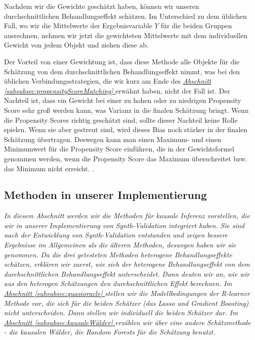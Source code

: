 \documentclass[12pt,a4paper,twoside]{scrartcl}
\numberwithin{equation}{section}
\newcommand{\refsec}[1]{\emph{\hyperref[#1]{Abschnitt \ref*{#1} }}}
\begin{document}
\noindent
Nachdem wir die Gewichte geschätzt haben, können wir unseren durchschnittlichen Behandlungseffekt schätzen. Im Unterschied zu dem üblichen Fall, wo wir die Mittelwerte der Ergebnisvariable $Y$ für die beiden Gruppen ausrechnen, nehmen wir jetzt die gewichteten Mittelwerte mit dem individuellen Gewicht von jedem Objekt und ziehen diese ab.\par

\noindent
Der Vorteil von einer Gewichtung ist, dass diese Methode alle Objekte für die Schätzung von dem durchschnittlichen Behandlungseffekt nimmt, was bei den üblichen Verbindungsstrategien, die wir kurz am Ende des \refsec{subsubsec:propensityScoreMatching} erwähnt haben, nicht der Fall ist. Der Nachteil ist, dass ein Gewicht bei einer zu hohen oder zu niedrigen Propensity Score sehr groß werden kann, was Varianz in die finalen Schätzung bringt. Wenn die Propensity Scores richtig geschätzt sind, sollte dieser Nachteil keine Rolle spielen. Wenn sie aber gestreut sind, wird dieses Bias noch stärker in der finalen Schätzung übertragen. Deswegen kann man einen Maximum- und einen Minimumwert für die Propensity Score einführen, die in der Gewichtsformel genommen werden, wenn die Propensity Score das Maximum überschreitet bzw. das Minimum nicht erreicht. \cite{stuart2010matching}.  
\par

\subsection{Methoden in unserer Implementierung}\label{subsec:methodenInImplementierung}
\noindent
\emph{In diesem Abschnitt werden wir die Methoden für kausale Inferenz vorstellen, die wir in unserer Implementierung von Synth-Validation integriert haben. Sie sind nach der Entwicklung von Synth-Validation entstanden und zeigen bessere Ergebnisse im Allgemeinen als die älteren Methoden, deswegen haben wir sie genommen. Da die drei getesteten Methoden heterogene Behandlungseffekte schätzen, erklären wir zuerst, wie sich der heterogene Behandlungseffekt von dem durchschnittlichen Behandlungseffekt unterscheidet. Dann deuten wir an, wie wir aus den heterogen Schätzungen den durchschnittlichen Effekt berechnen. Im \refsec{subsubsec:quasioracle} stellen wir die Modellbedingungen der R-learner Methode vor, die sich für die beiden Schätzer (das Lasso und Gradient Boosting) nicht unterscheiden. Dann stellen wir individuell die beiden Schätzer dar. Im \refsec{subsubsec:kausaleWälder} erzählen wir über eine andere Schätzmethode - die kausalen Wälder, die Random Forests für die Schätzung benutzt.}\par
\end{document}
